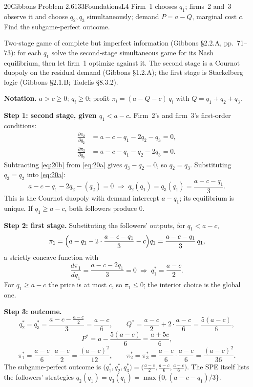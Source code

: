 \begin{exsol}{20}{Gibbons Problem 2.6}{133}{Foundations}{L4}
\asked Firm~1 chooses $q_1$; firms~2 and~3 observe it and choose $q_2, q_3$ simultaneously;
demand $P = a - Q$, marginal cost $c$. Find the subgame-perfect outcome.

\method Two-stage game of complete but imperfect information (Gibbons \S2.2.A, pp.~71--73): for each
$q_1$ solve the second-stage simultaneous game for its Nash equilibrium, then let firm~1 optimize
against it. The second stage is a Cournot duopoly on the residual demand (Gibbons \S1.2.A); the
first stage is Stackelberg logic (Gibbons \S2.1.B; Tadelis \S8.3.2).

\solution
\textbf{Notation.} $a > c \ge 0$; $q_i \ge 0$; profit $\pi_i = (a - Q - c)\,q_i$ with
$Q = q_1 + q_2 + q_3$.

\textbf{Step 1: second stage, given $q_1 < a - c$.} Firm~2's and firm~3's first-order conditions:
\begin{align}
  \frac{\partial\pi_2}{\partial q_2} &= a - c - q_1 - 2q_2 - q_3 = 0, \label{eq:20a}\\
  \frac{\partial\pi_3}{\partial q_3} &= a - c - q_1 - q_2 - 2q_3 = 0. \label{eq:20b}
\end{align}
Subtracting \eqref{eq:20b} from \eqref{eq:20a} gives $q_3 - q_2 = 0$, so $q_2 = q_3$. Substituting
$q_3 = q_2$ into \eqref{eq:20a}:
\[
  a - c - q_1 - 2q_2 - (q_2) = 0 \;\Rightarrow\; q_2(q_1) = q_3(q_1) = \frac{a - c - q_1}{3}.
\]
This is the Cournot duopoly with demand intercept $a - q_1$; its equilibrium is unique. If
$q_1 \ge a - c$, both followers produce $0$.

\textbf{Step 2: first stage.} Substituting the followers' outputs, for $q_1 < a - c$,
\[
  \pi_1 = \Bigl(a - q_1 - 2\cdot\frac{a - c - q_1}{3} - c\Bigr) q_1
        = \frac{a - c - q_1}{3}\, q_1 ,
\]
a strictly concave function with
\[
  \frac{d\pi_1}{dq_1} = \frac{a - c - 2q_1}{3} = 0 \;\Rightarrow\; q_1^* = \frac{a - c}{2}.
\]
For $q_1 \ge a - c$ the price is at most $c$, so $\pi_1 \le 0$; the interior choice is the global one.

\textbf{Step 3: outcome.}
\[
  q_2^* = q_3^* = \frac{a - c - \frac{a-c}{2}}{3} = \frac{a - c}{6}, \qquad
  Q^* = \frac{a-c}{2} + 2\cdot\frac{a-c}{6} = \frac{5(a - c)}{6},
\]
\[
  P^* = a - \frac{5(a-c)}{6} = \frac{a + 5c}{6},
\]
\[
  \pi_1^* = \frac{a - c}{6}\cdot\frac{a - c}{2} = \frac{(a-c)^2}{12}, \qquad
  \pi_2^* = \pi_3^* = \frac{a-c}{6}\cdot\frac{a-c}{6} = \frac{(a-c)^2}{36}.
\]
The subgame-perfect outcome is $\bigl(q_1^*, q_2^*, q_3^*\bigr) = \bigl(\frac{a-c}{2},
\frac{a-c}{6}, \frac{a-c}{6}\bigr)$. The SPE itself lists the followers' strategies
$q_2(q_1) = q_3(q_1) = \max\{0, (a - c - q_1)/3\}$.


\end{exsol}
